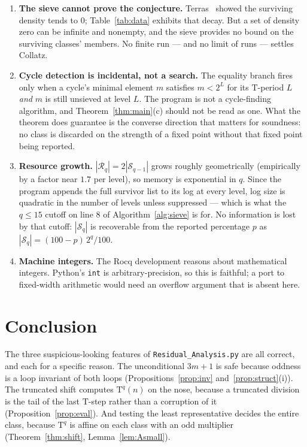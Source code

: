 \documentclass[11pt,a4paper]{article}
\theoremstyle{plain}
\theoremstyle{definition}
\newcommand{\Tmap}{\mathrm{T}}
\newcommand{\Rlev}{\mathcal{R}}
\newcommand{\Slev}{\mathcal{S}}
\begin{document}
\begin{enumerate}\itemsep4pt
\item \textbf{The sieve cannot prove the conjecture.} Terras~\cite{terras}
      showed the surviving density tends to $0$; Table~\ref{tab:data} exhibits
      that decay. But a set of density zero can be infinite and nonempty, and
      the sieve provides no bound on the surviving classes' members. No
      finite run --- and no limit of runs --- settles Collatz.

\item \textbf{Cycle detection is incidental, not a search.} The equality
      branch fires only when a cycle's minimal element $m$ satisfies
      $m < 2^{L}$ for its $\Tmap$-period $L$ \emph{and} $m$ is still unsieved
      at level $L$. The program is not a cycle-finding algorithm, and
      Theorem~\ref{thm:main}(c) should not be read as one. What the theorem
      does guarantee is the converse direction that matters for soundness: no
      class is discarded on the strength of a fixed point without that fixed
      point being reported.

\item \textbf{Resource growth.} $|\Rlev_{q}| = 2|\Slev_{q-1}|$ grows roughly
      geometrically (empirically by a factor near $1.7$ per level), so memory
      is exponential in $q$. Since the program appends the full survivor list
      to its log at every level, log size is quadratic in the number of levels
      unless suppressed --- which is what the $q \leq 15$ cutoff on line 8 of
      Algorithm~\ref{alg:sieve} is for. No information is lost by that cutoff:
      $|\Slev_{q}|$ is recoverable from the reported percentage $p$ as
      $|\Slev_{q}| = (100 - p)\,2^{q}/100$.

\item \textbf{Machine integers.} The Rocq development reasons about
      mathematical integers. Python's \texttt{int} is arbitrary-precision, so
      this is faithful; a port to fixed-width arithmetic would need an
      overflow argument that is absent here.
\end{enumerate}

\section{Conclusion}

The three suspicious-looking features of \texttt{Residual\_Analysis.py} are all
correct, and each for a specific reason. The unconditional $3m+1$ is safe
because oddness is a loop invariant of both loops
(Propositions~\ref{prop:inv} and~\ref{prop:struct}(i)). The truncated shift
computes $\Tmap^{q}(n)$ on the nose, because a truncated division is the tail
of the last $\Tmap$-step rather than a corruption of it
(Proposition~\ref{prop:eval}). And testing the least representative decides
the entire class, because $\Tmap^{q}$ is affine on each class with an odd
multiplier (Theorem~\ref{thm:shift}, Lemma~\ref{lem:Asmall}).
\end{document}
